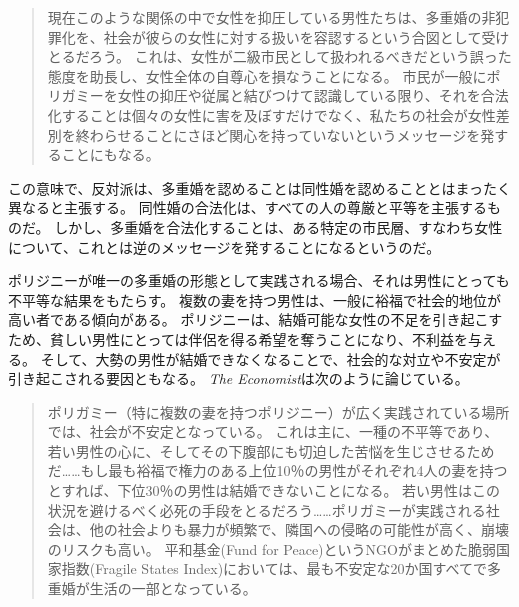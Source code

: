 \documentclass[paper=a4,book,openany]{jlreq}
\begin{document}
\begin{quote}
現在このような関係の中で女性を抑圧している男性たちは、多重婚の非犯罪化を、社会が彼らの女性に対する扱いを容認するという合図として受けとるだろう。
これは、女性が二級市民として扱われるべきだという誤った態度を助長し、女性全体の自尊心を損なうことになる。
市民が一般にポリガミーを女性の抑圧や従属と結びつけて認識している限り、それを合法化することは個々の女性に害を及ぼすだけでなく、私たちの社会が女性差別を終わらせることにさほど関心を持っていないというメッセージを発することにもなる。
\citep[p.272]{crookston15:_love_polyg_marriag}
\end{quote}

この意味で、反対派は、多重婚を認めることは同性婚を認めることとはまったく異なると主張する。
同性婚の合法化は、すべての人の尊厳と平等を主張するものだ。
しかし、多重婚を合法化することは、ある特定の市民層、すなわち女性について、これとは逆のメッセージを発することになるというのだ。

ポリジニーが唯一の多重婚の形態として実践される場合、それは男性にとっても不平等な結果をもたらす。
複数の妻を持つ男性は、一般に裕福で社会的地位が高い者である傾向がある。
ポリジニーは、結婚可能な女性の不足を引き起こすため、貧しい男性にとっては伴侶を得る希望を奪うことになり、不利益を与える。
そして、大勢の男性が結婚できなくなることで、社会的な対立や不安定が引き起こされる要因ともなる。
\emph{The Economist}は次のように論じている。

\begin{quote}
ポリガミー（特に複数の妻を持つポリジニー）が広く実践されている場所では、社会が不安定となっている。
これは主に、一種の不平等であり、若い男性の心に、そしてその下腹部にも切迫した苦悩を生じさせるためだ……もし最も裕福で権力のある上位10％の男性がそれぞれ4人の妻を持つとすれば、下位30％の男性は結婚できないことになる。
若い男性はこの状況を避けるべく必死の手段をとるだろう……ポリガミーが実践される社会は、他の社会よりも暴力が頻繁で、隣国への侵略の可能性が高く、崩壊のリスクも高い。
平和基金(Fund for Peace)というNGOがまとめた脆弱国家指数(Fragile States Index)においては、最も不安定な20か国すべてで多重婚が生活の一部となっている。
\citep{economist17:_link_between_polyg_war}
\end{quote}
\end{document}
